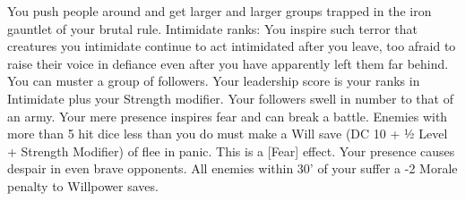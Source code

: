\skillfeat
{You push people around and get larger and larger groups trapped in the iron gauntlet of your brutal rule.}
{Intimidate ranks:}
{You inspire such terror that creatures you intimidate continue to act intimidated after you leave, too afraid to raise their voice in defiance even after you have apparently left them far behind.}
{You can muster a group of followers. Your leadership score is your ranks in Intimidate plus your Strength modifier.}
{Your followers swell in number to that of an army.}
{Your mere presence inspires fear and can break a battle. Enemies with more than 5 hit dice less than you do must make a Will save (DC 10 + ½ Level + Strength Modifier) of flee in panic. This is a [Fear] effect.}
{Your presence causes despair in even brave opponents. All enemies within 30' of your suffer a -2 Morale penalty to Willpower saves.}